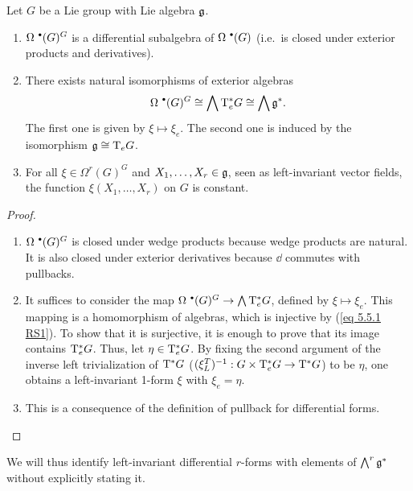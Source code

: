 \begin{prop}[{{\cite[Prop.~5.5.2]{RS1}}}]\label{prop 5.5.2 RS1}
    Let $G$ be a Lie group with Lie algebra $\mathfrak{g}$.
    \begin{enumerate}
        \item $\Omega^{\smbullet }(G)^G$ is a differential subalgebra of $\Omega^{\smbullet }(G)$ (i.e.~is closed under exterior products and derivatives).
        \item There exists natural isomorphisms of exterior algebras
        \[\Omega^{\smbullet }(G)^G\cong \bigwedge \T^\ast_e G\cong \bigwedge \frakg^\ast.\]
        The first one is given by $\xi\mapsto \xi_e$. The second one is induced by the isomorphism $\mathfrak{g}\cong \mathrm{T}_eG$.
        \item For all $\xi\in\Omega^r(G)^G$ and $X_1,\ldots,X_r\in\mathfrak{g}$, seen as left-invariant vector fields, the function $\xi(X_1,\ldots,X_r)$ on $G$ is constant.
    \end{enumerate}
\end{prop}
\begin{proof}
    \begin{enumerate}
        \item $\Omega^{\smbullet }(G)^G$ is closed under wedge products because wedge products are natural. It is also closed under exterior derivatives because $\dd$ commutes with pullbacks.
        \item It suffices to consider the map $\Omega^{\smbullet }(G)^G\to\bigwedge \T^\ast_e G$, defined by $\xi\mapsto\xi_e$. This mapping is a homomorphism of algebras, which is injective by (\ref{eq 5.5.1 RS1}). To show that it is surjective, it is enough to prove that its image contains $\mathrm{T}^\ast_e G$. Thus, let $\eta\in \mathrm{T}^\ast_e G$. By fixing the second argument of the inverse left trivialization of $\mathrm{T}^\ast G$ ($(\xi_L^T)^{-1}:G\times \mathrm{T}_e^\ast G\to \mathrm{T}^\ast G$) to be $\eta$, one obtains a left-invariant 1-form $\xi$ with $\xi_e=\eta$.
        \item  This is a consequence of the definition of pullback for differential forms.
    \end{enumerate}
\end{proof}

We will thus identify left-invariant differential $r$-forms with elements of $\bigwedge^r\mathfrak{g}^\ast$ without explicitly stating it. 


